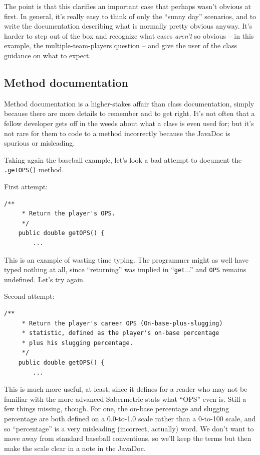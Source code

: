 The point is that this clarifies an important case that perhaps wasn't obvious
at first. In general, it's really easy to think of only the ``sunny day''
scenarios, and to write the documentation describing what is normally pretty
obvious anyway. It's harder to step out of the box and recognize what cases
\textit{aren't} so obvious -- in this example, the multiple-team-players
question -- and give the user of the class guidance on what to expect.


\subsection{Method documentation}

Method documentation is a higher-stakes affair than class documentation,
simply because there are more details to remember and to get right. It's not
often that a fellow developer gets off in the weeds about what a class is even
used for; but it's not rare for them to code to a method incorrectly because
the JavaDoc is spurious or misleading.

Taking again the baseball example, let's look a bad attempt to document the
\texttt{.getOPS()} method.

First attempt:
\vspace{-.15in}
\begin{Verbatim}[fontsize=\footnotesize,samepage=true,frame=single]
    /**
     * Return the player's OPS.
     */
    public double getOPS() {
        ...
\end{Verbatim}

This is an example of wasting time typing. The programmer might as well have
typed nothing at all, since ``returning'' was implied in ``\texttt{get}...'' and
\texttt{OPS} remains undefined. Let's try again.

\smallskip
Second attempt:
\vspace{-.1in}
\begin{Verbatim}[fontsize=\footnotesize,samepage=true,frame=single]
    /**
     * Return the player's career OPS (On-base-plus-slugging)
     * statistic, defined as the player's on-base percentage
     * plus his slugging percentage.
     */
    public double getOPS() {
        ...
\end{Verbatim}

This is much more useful, at least, since it defines for a reader who may not
be familiar with the more advanced Sabermetric stats what ``OPS'' even is.
Still a few things missing, though. For one, the on-base percentage and
slugging percentage are both defined on a 0.0-to-1.0 scale rather than a
0-to-100 scale, and so ``percentage'' is a very misleading (incorrect,
actually) word. We don't want to move away from standard baseball
conventions, so we'll keep the terms but then make the scale clear in a note
in the JavaDoc.

